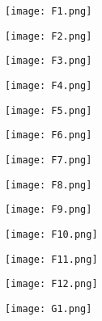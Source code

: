 \documentclass{article}
\begin{document}
\begin{figure}[!hb]
\centering
\texttt{[image:  F1.png]}
\end{figure}

\begin{figure}[!hb]
\centering
\texttt{[image:  F2.png]}
\end{figure}

\begin{figure}[!hb]
\centering
\texttt{[image:  F3.png]}
\end{figure}

\begin{figure}[!hb]
\centering
\texttt{[image:  F4.png]}
\end{figure}

\begin{figure}[!hb]
\centering
\texttt{[image:  F5.png]}
\end{figure}

\begin{figure}[!hb]
\centering
\texttt{[image:  F6.png]}
\end{figure}

\begin{figure}[!hb]
\centering
\texttt{[image:  F7.png]}
\end{figure}

\begin{figure}[!hb]
\centering
\texttt{[image:  F8.png]}
\end{figure}

\begin{figure}[!hb]
\centering
\texttt{[image:  F9.png]}
\end{figure}

\begin{figure}[!hb]
\centering
\texttt{[image:  F10.png]}
\end{figure}

\begin{figure}[!hb]
\centering
\texttt{[image:  F11.png]}
\end{figure}

\begin{figure}[!hb]
\centering
\texttt{[image:  F12.png]}
\end{figure}

\begin{figure}[!hb]
\centering
\texttt{[image:  G1.png]}
\end{figure}
\end{document}
